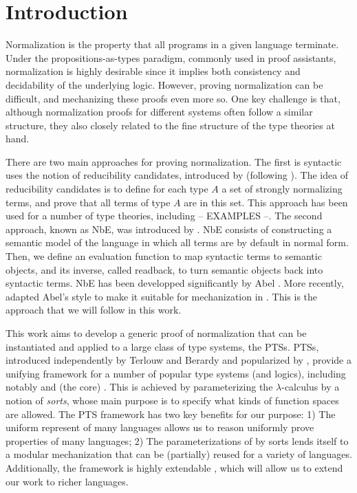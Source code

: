 \section{Introduction}

Normalization is the property that all programs in a given language terminate.
Under the propositions-as-types paradigm, commonly used in proof assistants,
  normalization is highly desirable since it implies both consistency and decidability of the underlying logic.
However, proving normalization can be difficult, and mechanizing these proofs even more so.
One key challenge is that, although normalization proofs for different systems often follow a similar structure,
  they also closely related to the fine structure of the type theories at hand.
  
There are two main approaches for proving normalization.
The first is syntactic uses the notion of reducibility candidates, introduced by \citet{G72} (following \citet{T67}).
The idea of reducibility candidates is to define for each type $A$ a set of strongly normalizing terms, and prove that all terms of type $A$ are in this set.
This approach has been used for a number of type theories, including -- EXAMPLES --.
The second approach, known as \ac{NbE}, was introduced by \citet{BS91}.
\ac{NbE} consists of constructing a semantic model of the language in which all terms are by default in normal form.
Then, we define an evaluation function to map syntactic terms to semantic objects, and its inverse, called readback, to turn semantic objects back into syntactic terms.
\ac{NbE} has been developped significantly by Abel \citep{AAD07, ACD07, A10, A13}.
More recently, \citet{mctt} adapted Abel's style to make it suitable for mechanization in \rocq.
This is the approach that we will follow in this work.
  
This work aims to develop a generic proof of normalization that can be instantiated and applied to a large class of type systems, the \acp{PTS}.
\Acp{PTS}, introduced independently by Terlouw and Berardy and popularized by \citet{B91},
  provide a unifying framework for a number of popular type systems (and logics), including notably \coc and (the core) \mltt.
This is achieved by parameterizing the $\lambda$-calculus by a notion of \textit{sorts}, whose main purpose is to specify what kinds of function spaces are allowed.  
The \ac{PTS} framework has two key benefits for our purpose:
1) The uniform represent of many languages allows us to reason uniformly prove properties of many languages;
2) The parameterizations of by sorts lends itself to a modular mechanization that can be (partially) reused for a variety of languages.
Additionally, the framework is highly extendable \citep{B95, BCK03, C97, FP15, RD14, SP94, SV12, YO19, Z99}, which will allow us to extend our work to richer languages.

